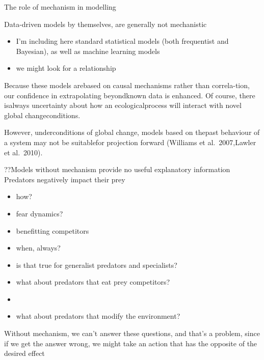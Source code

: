 \documentclass[
  ignorenonframetext,
]{beamer}
\providecommand{\tightlist}{%
  \setlength{\itemsep}{0pt}\setlength{\parskip}{0pt}}
\begin{document}
\begin{frame}{The role of mechanism in modelling}
\protect\hypertarget{the-role-of-mechanism-in-modelling}{}
\begin{block}{Data-driven models by themselves, are generally not
mechanistic }
\protect\hypertarget{data-driven-models-by-themselves-are-generally-not-mechanistic}{}
\begin{itemize}
\tightlist
\item
  I'm including here standard statistical models (both frequentist and
  Bayesian), as well as machine learning models
\item
  we might look for a relationship
\end{itemize}

Because these models arebased on causal mechanisms rather than
correla-tion, our confidence in extrapolating beyondknown data is
enhanced. Of course, there isalways uncertainty about how an
ecologicalprocess will interact with novel global changeconditions.

However, underconditions of global change, models based on thepast
behaviour of a system may not be suitablefor projection forward
(Williams et al.~2007,Lawler et al.~2010).
\end{block}

\begin{block}{??Models without mechanism provide no useful explanatory
information}
\protect\hypertarget{models-without-mechanism-provide-no-useful-explanatory-information}{}
Predators negatively impact their prey

\begin{itemize}
\item
  how?
\item
  fear dynamics?
\item
  benefitting competitors
\item
  when, always?
\item
  is that true for generalist predators and specialists?
\item
  what about predators that eat prey competitors?
\item
\item
  what about predators that modify the environment?
\end{itemize}

Without mechanism, we can't answer these questions, and that's a
problem, since if we get the answer wrong, we might take an action that
has the opposite of the desired effect
\end{block}


\end{frame}
\end{document}
